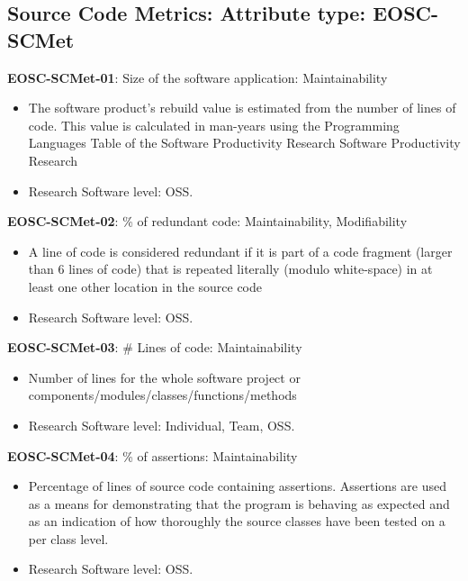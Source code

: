 \subsection{Source Code Metrics: Attribute type: EOSC-SCMet}

\textbf{EOSC-SCMet-01}: Size of the software application: Maintainability

\begin{itemize}
    \item The software product's rebuild value is estimated from the number of lines of code. This value is calculated in man-years using the  Programming Languages Table of the Software Productivity Research Software Productivity Research~\cite{baggen_standardized_2012}
    \item Research Software level: OSS.
\end{itemize}

\textbf{EOSC-SCMet-02}: \% of redundant code: Maintainability, Modifiability

\begin{itemize}
    \item A line of code is considered redundant if it is part of a code fragment (larger than 6 lines of code) that is repeated literally (modulo  white-space) in at least one other location in the source code~\cite{baggen_standardized_2012}
    \item Research Software level: OSS.
\end{itemize}

\textbf{EOSC-SCMet-03}: \# Lines of code: Maintainability

\begin{itemize}
    \item Number of lines for the whole software project or components/modules/classes/functions/methods~\cite{montagud_systematic_2012,baggen_standardized_2012}
    \item Research Software level: Individual, Team, OSS.
\end{itemize}

\textbf{EOSC-SCMet-04}: \% of assertions: Maintainability

\begin{itemize}
    \item Percentage of lines of source code containing assertions. Assertions are used as a means for demonstrating that the program is behaving as expected and as an indication of how thoroughly the source classes have been tested on a per class level.~\cite{nagappan_early_2005}
    \item Research Software level: OSS.
\end{itemize}

